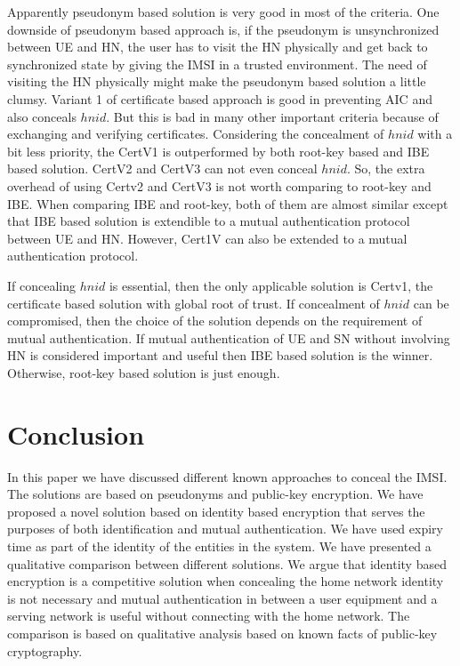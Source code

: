 \documentclass{river-journal}
\begin{document}
Apparently pseudonym based solution is very good in most of the criteria. One downside of pseudonym based approach is, if the pseudonym is unsynchronized between UE and HN, the user has to visit the HN physically and get back to synchronized state by giving the IMSI in a trusted environment. The need of visiting the HN physically might make the pseudonym based solution a little clumsy. Variant 1 of certificate based approach is good in preventing AIC and also conceals $hnid$. But this is bad in many other important criteria because of exchanging and verifying certificates. Considering the concealment of $hnid$ with a bit less priority, the CertV1 is outperformed by both root-key based and IBE based solution. CertV2 and CertV3 can not even conceal $hnid$. So, the extra overhead of using Certv2 and CertV3 is not worth comparing to root-key and IBE. When comparing IBE and root-key, both of them are almost similar except that IBE based solution is extendible to a mutual authentication protocol between UE and HN. However, Cert1V can also be extended to a mutual authentication protocol. 





If concealing $hnid$ is essential, then the only applicable solution is Certv1, the certificate based solution with global root of trust. If concealment of $hnid$ can be compromised, then the choice  of the solution depends on the requirement of mutual authentication. If mutual authentication of UE and SN without involving HN is considered important and useful then IBE based solution is the winner. Otherwise, root-key based solution is just enough.


\section{Conclusion}
\label{sec:conclusion}In this paper we have discussed different known approaches to conceal the IMSI. The solutions  are based on pseudonyms and public-key encryption. We have proposed a novel solution based on identity based encryption that serves the purposes of both identification and mutual authentication. We have used expiry time as part of the identity of the entities in the system. We have presented a qualitative comparison between different  solutions. We argue that identity based encryption is a competitive solution when concealing the home network identity is not necessary and mutual authentication in between a user equipment and a serving network is useful without connecting with the home network. The comparison is based on qualitative analysis based on known facts of public-key cryptography.
\end{document}
